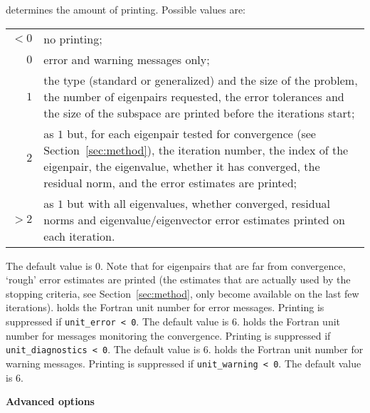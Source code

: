 \begin{description}
%
determines the amount of printing.
Possible values are:\\
%
\begin{tabular}{r@{ : }p{}}
$<0$ & no printing;\\
$0$ & error and warning messages only;\\
$1$ & the type (standard or generalized) and the size of the problem,
   the number of eigenpairs requested, the error tolerances and the size of
   the subspace are printed before the iterations start;\\
$2$ & as $1$ but, for each eigenpair tested for convergence (see
   Section~\ref{sec:method}), the iteration number, the index of the
   eigenpair, the eigenvalue, whether it has converged, the residual norm, and
   the error estimates are printed;\\
$>2$ & as $1$ but with all eigenvalues, whether converged, residual norms
   and eigenvalue/eigenvector error estimates printed on each iteration. 
\end{tabular}

\noindent
The default value is 0.
Note that for eigenpairs that are far from convergence,
`rough' error estimates are printed
(the estimates that are actually used by the stopping criteria,
see Section~\ref{sec:method}, only become available on the last few
iterations).
%
holds the Fortran unit number for error messages.
Printing is suppressed if {\tt unit\_error < 0}.
The default value is 6. 
%
holds the Fortran unit number for messages  monitoring the convergence.
Printing is suppressed if {\tt unit\_diagnostics < 0}.
The default value is 6. 
%
holds the Fortran unit number for warning messages.
Printing is suppressed if {\tt unit\_warning < 0}.
The default value is 6. 
%
\end{description}

\medskip
\noindent
{\bf Advanced options}

